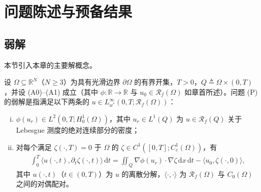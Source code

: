 \documentclass[../../main.tex]{subfiles}%
\begin{document}
\section{问题陈述与预备结果}\label{section:ch06-问题陈述}

\subsection{弱解}\label{subsection:ch06-弱解}

本节引入本章的主要解概念。

\begin{definition}\label{definition:ch06-弱解}
设 $\Omega\subseteq\mathbb{R}^N$（$N\geqslant3$）为具有光滑边界 $\partial\Omega$ 的有界开集，$T>0$，$Q\triangleq\Omega\times(0,T)$，并设 (A0)--(A1) 成立（其中 $\phi:\mathbb{R}\to\mathbb{R}$ 与 $u_0\in\mathscr{R}_f(\Omega)$ 如章首所述）。问题 (P) 的弱解是指满足以下两条的 $u\in L^\infty_{w^*}(0,T;\mathscr{R}_f(\Omega))$：
\begin{enumerate}[(i)]
\item $\phi(u_r)\in L^2(0,T;H^1_0(\Omega))$，其中 $u_r\in L^1(Q)$ 为 $u\in\mathscr{R}_f(Q)$ 关于 Lebesgue 测度的绝对连续部分的密度；
\item 对每个满足 $\zeta(\cdot,T)=0$ 于 $\Omega$ 的 $\zeta\in C^1([0,T];C^1_c(\Omega))$，有
\begin{align}
\int_0^T\langle u(\cdot,t),\partial_t\zeta(\cdot,t)\rangle\,\mathrm{d}t
= \iint_Q\nabla\phi(u_r)\cdot\nabla\zeta\,\mathrm{d}x\,\mathrm{d}t
-\langle u_0,\zeta(\cdot,0)\rangle , \label{align:ch6-6.2}
\end{align}
其中 $u(\cdot,t)$（$t\in(0,T)$）为 $u$ 的离散分解，$\langle\cdot,\cdot\rangle$ 为 $\mathscr{R}_f(\Omega)$ 与 $C_0(\Omega)$ 之间的对偶配对。
\end{enumerate}
\end{definition}
\end{document}
